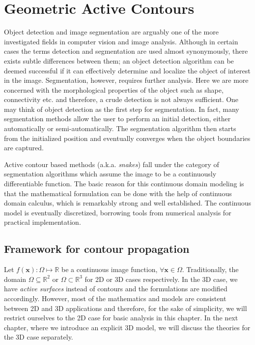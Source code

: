 
\chapter{Geometric Active Contours} %

\label{GAC_chapter} %



Object detection and image segmentation are arguably one of the more investigated fields in computer vision and image analysis. Although in certain cases the terms detection and segmentation are used almost synonymously, there exists subtle differences between them; an object detection algorithm can be deemed successful if it can effectively determine and localize the object of interest in the image. Segmentation, however, requires further analysis. Here we are more concerned with the morphological properties of the object such as shape, connectivity etc. and therefore, a crude detection is not always sufficient. One may think of object detection as the first step for segmentation. In fact, many segmentation methods allow the user to perform an initial detection, either automatically or semi-automatically. The segmentation algorithm then starts from the initialized position and eventually converges when the object boundaries are captured.

Active contour based methods (a.k.a. \textit{snakes}) fall under the category of segmentation algorithms which assume the image to be a  continuously differentiable function. The basic reason for this continuous domain modeling is that the mathematical formulation can be done with the help of continuous domain calculus, which is remarkably strong and well established. The continuous model is eventually discretized, borrowing tools from numerical analysis for practical implementation.

\section{Framework for contour propagation}

Let $f(\textbf{x}):\Omega\mapsto\mathbb{R}$ be a continuous image function, $\forall\textbf{x}\in\Omega$. Traditionally, the domain $\Omega\subseteq\mathbb{R}^2$ or  $\Omega\subset\mathbb{R}^3$ for 2D or 3D cases respectively. In the 3D case, we have \textit{active surfaces} instead of contours and the formulations are modified accordingly. However, most of the mathematics and models are consistent between 2D and 3D applications and therefore, for the sake of simplicity, we will restrict ourselves to the 2D case for basic analysis in this chapter. In the next chapter, where we introduce an explicit 3D model, we will discuss the theories for the 3D case separately.

